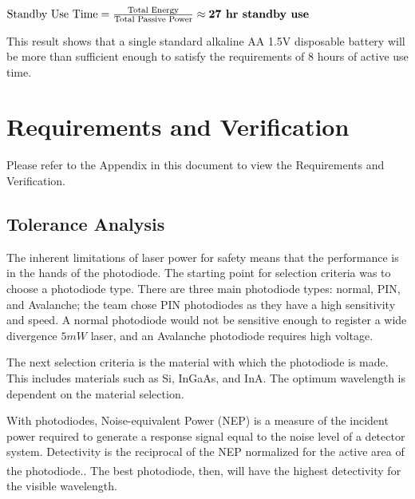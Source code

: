 \documentclass[letterpaper,10pt]{article}
\begin{document}
\begin{spacing}{1.15}
\begin{center}
	$\textrm{Standby Use Time} = \frac{\textrm{Total Energy}}{\textrm{Total Passive Power}} \approx \textrm{\textbf{27 hr standby use}}$
\end{center}

This result shows that a single standard alkaline AA 1.5V disposable battery will be more than sufficient enough to satisfy the requirements of 8 hours of active use time.

\section{Requirements and Verification} \label{section-requirements-verification}
Please refer to the Appendix in this document to view the Requirements and Verification.

\subsection{Tolerance Analysis} \label{section-tolerance-analysis}
The inherent limitations of laser power for safety means that the performance is in the hands of the photodiode. The starting point for selection criteria was to choose a photodiode type. There are three main photodiode types: normal, PIN, and Avalanche; the team chose PIN photodiodes as they have a high sensitivity and speed. A normal photodiode would not be sensitive enough to register a wide divergence $5mW$ laser, and an Avalanche photodiode requires high voltage. 

The next selection criteria is the material with which the photodiode is made. This includes materials such as Si, InGaAs, and InA. The optimum wavelength is dependent on the material selection.

With photodiodes, Noise-equivalent Power (NEP) is a measure of the incident power required to generate a response signal equal to the noise level of a detector system. Detectivity is the reciprocal of the NEP normalized for the active area of the photodiode.\textsuperscript{\cite{Microphotonics}}. The best photodiode, then, will have the highest detectivity for the visible wavelength.  


\end{spacing}
\end{document}
